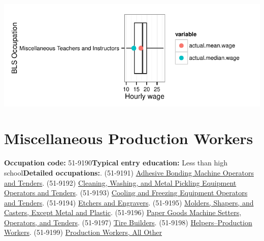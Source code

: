 \documentclass[a4paper,10pt]{article}\usepackage[]{graphicx}\usepackage[]{color}
\makeatletter
\def\maxwidth{ %
  \ifdim\Gin@nat@width>\linewidth
    \linewidth
  \else
    \Gin@nat@width
  \fi
}
\makeatother
\begin{document}
{\centering \includegraphics[width=\maxwidth]{figure/unnamed-chunk-234} 

}


\newpage\section{Miscellaneous Production Workers}\textbf{Occupation code:} 51-9190\newline\textbf{Typical entry education:} Less than high school\newline\textbf{Detailed occupations:}. (51-9191)  \href{http://www.bls.gov/oes/current/oes519191.htm}{Adhesive Bonding Machine Operators and Tenders}. (51-9192)  \href{http://www.bls.gov/oes/current/oes519192.htm}{Cleaning, Washing, and Metal Pickling Equipment Operators and Tenders}. (51-9193)  \href{http://www.bls.gov/oes/current/oes519193.htm}{Cooling and Freezing Equipment Operators and Tenders}. (51-9194)  \href{http://www.bls.gov/oes/current/oes519194.htm}{Etchers and Engravers}. (51-9195)  \href{http://www.bls.gov/oes/current/oes519195.htm}{Molders, Shapers, and Casters, Except Metal and Plastic}. (51-9196)  \href{http://www.bls.gov/oes/current/oes519196.htm}{Paper Goods Machine Setters, Operators, and Tenders}. (51-9197)  \href{http://www.bls.gov/oes/current/oes519197.htm}{Tire Builders}. (51-9198)  \href{http://www.bls.gov/oes/current/oes519198.htm}{Helpers--Production Workers}. (51-9199)  \href{http://www.bls.gov/oes/current/oes519199.htm}{Production Workers, All Other}\newline%
\end{document}
